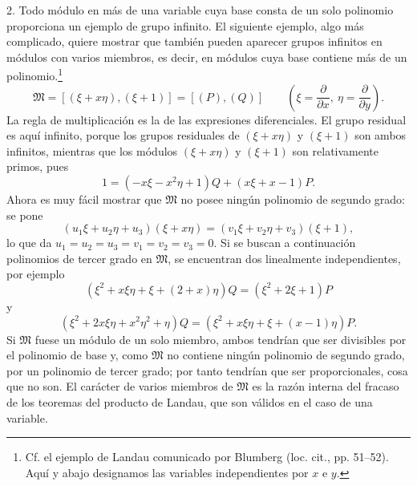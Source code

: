 2. Todo módulo en más de una variable cuya base consta de un solo polinomio proporciona un ejemplo de grupo infinito. El siguiente ejemplo, algo más complicado, quiere mostrar que también pueden aparecer grupos infinitos en módulos con varios miembros, es decir, en módulos cuya base contiene más de un polinomio.\footnote{Cf. el ejemplo de Landau comunicado por Blumberg (loc. cit., pp. 51--52). Aquí y abajo designamos las variables independientes por $x$ e $y$.}
\[
 \mathfrak M=[(\xi+x\eta),(\xi+1)]=[(P),(Q)]
 \qquad\left(\xi=\frac{\partial}{\partial x},\ \eta=\frac{\partial}{\partial y}\right).
\]
La regla de multiplicación es la de las expresiones diferenciales. El grupo residual es aquí infinito, porque los grupos residuales de $(\xi+x\eta)$ y $(\xi+1)$ son ambos infinitos, mientras que los módulos $(\xi+x\eta)$ y $(\xi+1)$ son relativamente primos, pues
\[
 1=(-x\xi-x^2\eta+1)Q+(x\xi+x-1)P.
\]
Ahora es muy fácil mostrar que $\mathfrak M$ no posee ningún polinomio de segundo grado: se pone
\[
 (u_1\xi+u_2\eta+u_3)(\xi+x\eta)=(v_1\xi+v_2\eta+v_3)(\xi+1),
\]
lo que da $u_1=u_2=u_3=v_1=v_2=v_3=0$. Si se buscan a continuación polinomios de tercer grado en $\mathfrak M$, se encuentran dos linealmente independientes, por ejemplo
\[
 (\xi^2+x\xi\eta+\xi+(2+x)\eta)Q=(\xi^2+2\xi+1)P
\]
y
\[
 (\xi^2+2x\xi\eta+x^2\eta^2+\eta)Q
 =(\xi^2+x\xi\eta+\xi+(x-1)\eta)P.
\]
Si $\mathfrak M$ fuese un módulo de un solo miembro, ambos tendrían que ser divisibles por el polinomio de base y, como $\mathfrak M$ no contiene ningún polinomio de segundo grado, por un polinomio de tercer grado; por tanto tendrían que ser proporcionales, cosa que no son. El carácter de varios miembros de $\mathfrak M$ es la razón interna del fracaso de los teoremas del producto de Landau, que son válidos en el caso de una variable.

